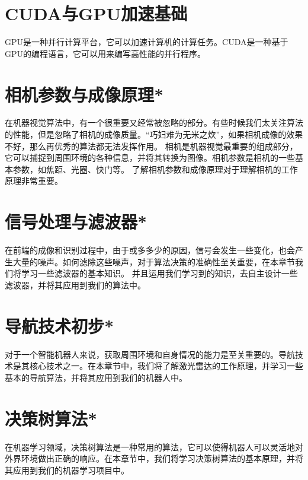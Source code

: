 \documentclass[withoutpreface,bwprint]{cumcmthesis} %
\begin{document}


\section{CUDA与GPU加速基础}
GPU是一种并行计算平台，它可以加速计算机的计算任务。CUDA是一种基于GPU的编程语言，它可以用来编写高性能的并行程序。

\section{相机参数与成像原理*} 

在机器视觉算法中，有一个很重要又经常被忽略的部分。有些时候我们太关注算法的性能，但是忽略了相机的成像质量。“巧妇难为无米之炊”，如果相机成像的效果不好，那么再优秀的算法都无法发挥作用。
相机是机器视觉最重要的组成部分，它可以捕捉到周围环境的各种信息，并将其转换为图像。相机参数是相机的一些基本参数，如焦距、光圈、快门等。
了解相机参数和成像原理对于理解相机的工作原理非常重要。

\section{信号处理与滤波器*}
在前端的成像和识别过程中，由于或多多少的原因，信号会发生一些变化，也会产生大量的噪声。如何滤除这些噪声，对于算法决策的准确性至关重要，在本章节我们将学习一些滤波器的基本知识。
并且运用我们学习到的知识，去自主设计一些滤波器，并将其应用到我们的算法中。

\section{导航技术初步*}
对于一个智能机器人来说，获取周围环境和自身情况的能力是至关重要的。导航技术是其核心技术之一。在本章节中，我们将了解激光雷达的工作原理，并学习一些基本的导航算法，并将其应用到我们的机器人中。

\section{\quad 决策树算法*}
在机器学习领域，决策树算法是一种常用的算法，它可以使得机器人可以灵活地对外界环境做出正确的响应。在本章节中，我们将学习决策树算法的基本原理，并将其应用到我们的机器学习项目中。

\end{document}
